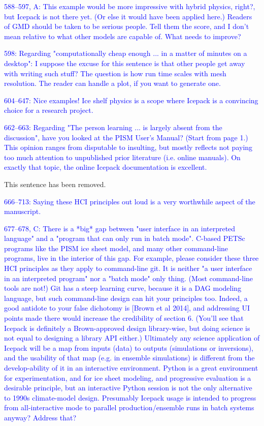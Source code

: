 \documentclass{article}
\theoremstyle{definition}
\theoremstyle{plain}
\begin{document}
\textcolor{blue}{588--597, A:  This example would be more impressive with hybrid physics, right?, but Icepack is not there yet.  (Or else it would have been applied here.)  Readers of GMD should be taken to be serious people.  Tell them the score, and I don't mean relative to what other models are capable of.  What needs to improve?}

\textcolor{blue}{598:  Regarding "computationally cheap enough ... in a matter of minutes on a desktop":  I suppose the excuse for this sentence is that other people get away with writing such stuff?  The question is how run time scales with mesh resolution.  The reader can handle a plot, if you want to generate one.}

\textcolor{blue}{604--647:  Nice examples!  Ice shelf physics is a scope where Icepack is a convincing choice for a research project.}

\textcolor{blue}{662--663:  Regarding "The person learning ... is largely absent from the discussion", have you looked at the PISM User's Manual?  (Start from page 1.)  This opinion ranges from disputable to insulting, but mostly reflects not paying too much attention to unpublished prior literature (i.e. online manuals).  On exactly that topic, the online Icepack documentation is excellent.}

This sentence has been removed.

\textcolor{blue}{666--713:  Saying these HCI principles out loud is a very worthwhile aspect of the manuscript.}

\textcolor{blue}{677--678, C:  There is a *big* gap between "user interface in an interpreted language" and a "program that can only run in batch mode".  C-based PETSc programs like the PISM ice sheet model, and many other command-line programs, live in the interior of this gap.  For example, please consider these three HCI principles as they apply to command-line git.  It is neither "a user interface in an interpreted program" nor a "batch mode" only thing.  (Most command-line tools are not!)  Git has a steep learning curve, because it is a DAG modeling language, but such command-line design can hit your principles too.  Indeed, a good antidote to your false dichotomy is [Brown et al 2014], and addressing UI points made there would increase the credibility of section 6.  (You'll see that Icepack is definitely a Brown-approved design library-wise, but doing science is not equal to designing a library API either.)  Ultimately any science application of Icepack will be a map from inputs (data) to outputs (simulations or inversions), and the usability of that map (e.g. in ensemble simulations) is different from the develop-ability of it in an interactive environment.  Python is a great environment for experimentation, and for ice sheet modeling, and progressive evaluation is a desirable principle, but an interactive Python session is not the only alternative to 1990s climate-model design.  Presumably Icepack usage is intended to progress from all-interactive mode to parallel production/ensemble runs in batch systems anyway?  Address that?}
\end{document}
